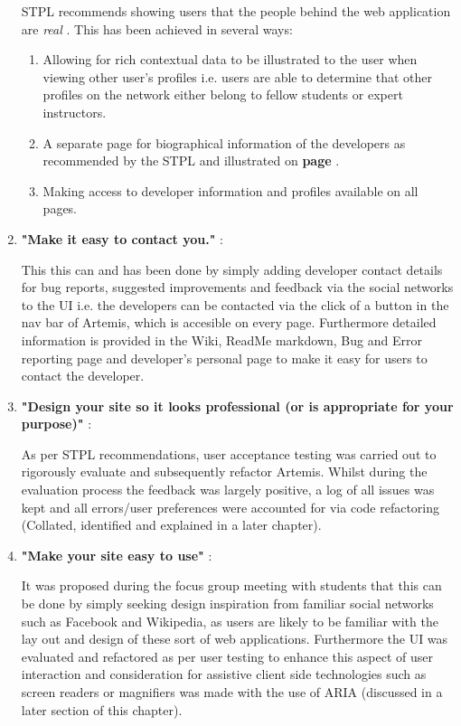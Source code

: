 \begin{enumerate}
    STPL recommends showing users that the people behind the web application are \textit{real} \cite{Fogg2002a}. This has been achieved in several ways:
    \begin{enumerate}
        \item Allowing for rich contextual data to be illustrated to the user when viewing other user's profiles i.e. users are able to determine that other profiles on the network either belong to fellow students or expert instructors.
        \item A separate page for biographical information of the developers as recommended by the STPL \cite{Fogg2002a} and illustrated on \textbf{page \pageref{developer}}.
        \item Making access to developer information and profiles available on all pages.
    \end{enumerate}
    
    \item \textbf{"Make it easy to contact you."} \cite{Fogg2002a}:
    
    This this can and has been done by simply adding developer contact details for bug reports, suggested improvements and feedback via the social networks to the UI i.e. the developers can be contacted via the click of a button in the nav bar of Artemis, which is accesible on every page. Furthermore detailed information is provided in the Wiki, ReadMe markdown, Bug and Error reporting page and developer's personal page to make it easy for users to contact the developer.

    \item \textbf{"Design your site so it looks professional (or is appropriate for your purpose)"} \cite{Fogg2002a}:
    
    As per STPL recommendations, user acceptance testing was carried out to rigorously evaluate and subsequently refactor Artemis. Whilst during the evaluation process the feedback was largely positive, a log of all issues was kept and all errors/user preferences were accounted for via code refactoring (Collated, identified and explained in a later chapter).

    \item \textbf{"Make your site easy to use"} \cite{Fogg2002a}:
    
    It was proposed during the focus group meeting with students that this can be done by simply seeking design inspiration from familiar social networks such as Facebook and Wikipedia, as users are likely to be familiar with the lay out and design of these sort of web applications\cite{Fogg2002a}. Furthermore the UI was evaluated and refactored as per user testing to enhance this aspect of user interaction and consideration  for assistive client side technologies such as screen readers or magnifiers was made with the use of ARIA (discussed in a later section of this chapter).
    

\end{enumerate}

